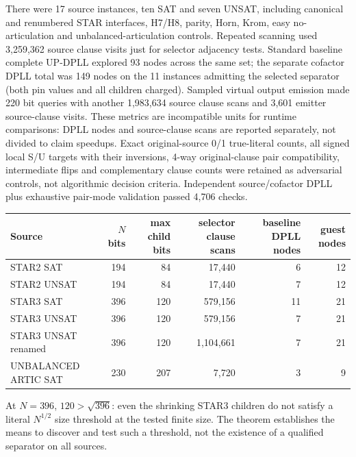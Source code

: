 \documentclass[11pt]{article}
\begin{document}
There were 17 source instances, ten SAT and seven UNSAT, including canonical and renumbered STAR interfaces, H7/H8, parity, Horn, Krom, easy no-articulation and unbalanced-articulation controls. Repeated scanning used 3,259,362 source clause visits just for selector adjacency tests. Standard baseline complete UP-DPLL explored 93 nodes across the same set; the separate cofactor DPLL total was 149 nodes on the 11 instances admitting the selected separator (both pin values and all children charged). Sampled virtual output emission made 220 bit queries with another 1,983,634 source clause scans and 3,601 emitter source-clause visits. These metrics are incompatible units for runtime comparisons: DPLL nodes and source-clause scans are reported separately, not divided to claim speedups. Exact original-source 0/1 true-literal counts, all signed local S/U targets with their inversions, 4-way original-clause pair compatibility, intermediate flips and complementary clause counts were retained as adversarial controls, not algorithmic decision criteria. Independent source/cofactor DPLL plus exhaustive pair-mode validation passed 4,706 checks.

\begin{center}\begin{tabular}{lrrrrr}\toprule
Source & $N$ bits & max child bits & selector clause scans & baseline DPLL nodes & guest nodes\\\midrule
STAR2 SAT &194&84&17,440&6&12\\
STAR2 UNSAT &194&84&17,440&7&12\\
STAR3 SAT &396&120&579,156&11&21\\
STAR3 UNSAT &396&120&579,156&7&21\\
STAR3 UNSAT renamed &396&120&1,104,661&7&21\\
UNBALANCED ARTIC SAT &230&207&7,720&3&9\\\bottomrule\end{tabular}\end{center}
At $N=396$, $120>\sqrt{396}$: even the shrinking STAR3 children do not satisfy a literal $N^{1/2}$ size threshold at the tested finite size. The theorem establishes the means to discover and test such a threshold, not the existence of a qualified separator on all sources.
\end{document}

